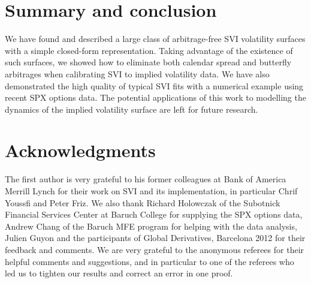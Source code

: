 \documentclass[12pt]{article}
\numberwithin{equation}{section}
\begin{document}
\newpage



\section{Summary and conclusion}\label{sec:conclusion}

We have found and described a large class of arbitrage-free SVI volatility surfaces with a simple closed-form representation.  Taking advantage of the existence of such surfaces, we showed how to eliminate both calendar spread and butterfly arbitrages when calibrating SVI to implied volatility data.  We have also demonstrated the high quality of typical SVI fits with a numerical example using recent SPX options data.
The potential applications of this work to modelling the dynamics of the implied volatility surface are left for future research.

\section*{Acknowledgments}

The first author is very grateful to his former colleagues at Bank of America Merrill Lynch for their work on SVI and its implementation, in particular Chrif Youssfi and Peter Friz.  
We also thank Richard Holowczak of the Subotnick Financial Services Center at Baruch College for supplying the SPX options data,
Andrew Chang of the Baruch MFE program for helping with the data analysis,
Julien Guyon and the participants of Global Derivatives, Barcelona 2012 for their feedback and comments.
We are very grateful to the anonymous referees for their helpful comments and suggestions, and in particular to one of the referees who led us to tighten our results and correct an error in one proof.




%
%
%
%
\end{document}
